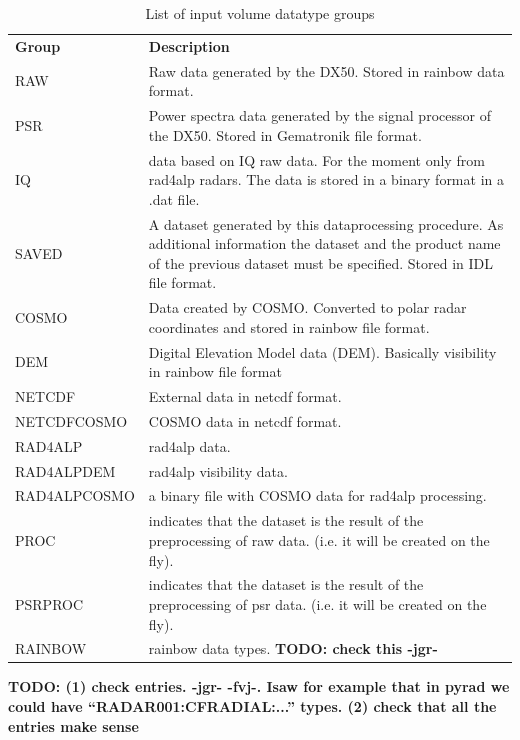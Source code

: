 \documentclass[a4paper,11pt,pdftex,twoside]{scrartcl}
\renewcommand{\bf}{\normalfont \bfseries}
\begin{document}
{{{\begin{table}[H]
\begin{tabularx}{\textwidth}{lX}
\bf{Group} & \bf{Description}\\
RAW       & Raw data generated by the DX50. Stored in rainbow data format.\\
PSR       & Power spectra data generated by the signal processor of the DX50.
            Stored in Gematronik file format.\\
IQ         & data based on IQ raw data. For the moment only from rad4alp radars. The data is stored in a binary format in a .dat file.\\
SAVED     & A dataset generated by this dataprocessing procedure. As additional
            information the dataset and the product name of the previous dataset
            must be specified. Stored in IDL file format.\\
COSMO     & Data created by COSMO. Converted to polar radar coordinates and
            stored in rainbow file format.\\
DEM     & Digital Elevation Model data (DEM). Basically visibility in rainbow file format\\
NETCDF    & External data in netcdf format.\\
NETCDFCOSMO    & COSMO data in netcdf format.\\
RAD4ALP & rad4alp data.\\
RAD4ALPDEM & rad4alp visibility data.\\
RAD4ALPCOSMO & a binary file with COSMO data for rad4alp processing.\\
PROC & indicates that the dataset is the result of the preprocessing of raw data. (i.e. it will be created on the fly).\\
PSRPROC & indicates that the dataset is the result of the preprocessing of psr data. (i.e. it will be created on the fly).\\
RAINBOW & rainbow data types. {\bf TODO: check this -jgr-}\\
\end{tabularx}
\caption{List of input volume datatype groups}
\label{tab_datatype_groups}
\end{table}

{\bf TODO: (1) check entries. -jgr- -fvj-. Isaw for example that in pyrad we could have ``RADAR001:CFRADIAL:...'' types. (2) check that all the entries make sense }

}}}
\end{document}

